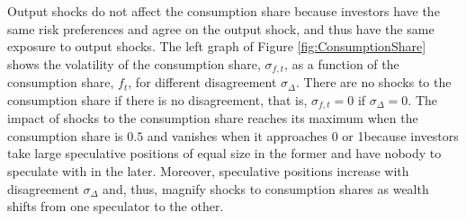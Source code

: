 \documentclass[preprint,11pt,authoryear]{elsarticle}
\theoremstyle{plain}
\begin{document}
Output shocks do not affect the consumption share because investors have the same risk preferences and agree on the output shock, and thus have the same exposure to output shocks.  The left graph of Figure \ref{fig:ConsumptionShare} shows the volatility of the consumption share, $\sigma_{f,t}$, as a function of the consumption share, $f_t$, for different disagreement $\sigma_{\Delta}$.  There are no shocks to the consumption share if there is no disagreement, that is, $\sigma_{f,t}=0$ if $\sigma_{\Delta}=0$. The impact of shocks to the consumption share reaches its maximum when the consumption share is $0.5$ and vanishes when it approaches $0$ or 1$ $because investors take large speculative positions of equal size in the former and have nobody to speculate with in the later. Moreover, speculative positions increase with disagreement $\sigma_{\Delta}$ and, thus, magnify shocks to consumption shares as wealth shifts from one speculator to the other.   
\end{document}
